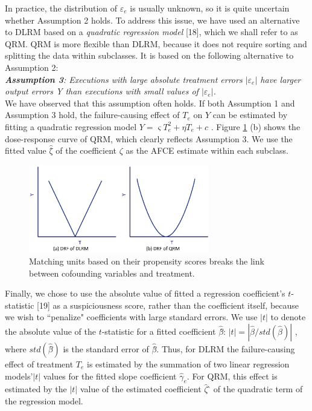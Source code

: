 \documentclass[times]{stvrauth}
\begin{document}
In practice, the distribution of $\varepsilon_e$  is usually unknown, so it is quite uncertain whether Assumption 2 holds.  To address this issue, we have used an alternative to DLRM based on a {\it quadratic regression model} [18], which we shall refer to as QRM.   QRM is more flexible than DLRM, because it does not require sorting and splitting the data within subclasses.  It is based on the following alternative to Assumption 2:\\
\newline
\textit{ \textbf{ Assumption 3}: Executions with large absolute treatment errors $\left| {{\varepsilon _e}} \right|$ have larger output errors Y than executions with small values of $\left| {{\varepsilon _e}} \right|$.}\\
\newline
We have observed that this assumption often holds.  If both Assumption 1 and Assumption 3 hold, the failure-causing effect of $T_e$ on $Y$ can be estimated by fitting a quadratic regression model $Y = \varsigma T_e^2 + \eta {T_e} + c$  . Figure \ref{DRF_curves} (b) shows the dose-response curve of QRM, which clearly reflects Assumption 3.  We use the fitted value $\hat \zeta $̂ of the coefficient $ \zeta $ as the AFCE estimate within each subclass.
\vspace{-0.1cm}

\begin{figure}[!thpb]
\centering
\includegraphics[width=0.7\textwidth]{DRF_curves.eps}
\caption{Matching units based on their propensity scores breaks the link between cofounding variables and treatment.}
\label{DRF_curves}
\end{figure}
\vspace{-0.1cm}

Finally, we chose to use the absolute value of fitted a regression coefficient's $t$-statistic [19] as a suspiciousness score, rather than the coefficient itself, because we wish to ``penalize" coefficients with large standard errors.  We use $\left| t \right|$ to denote the absolute value of the $t$-statistic for a fitted coefficient $\hat \beta $̂: $\left| t \right| = |\hat \beta /std ( {\hat \beta })|$ , where $std(\hat \beta ̂)$ is the standard error of $\hat \beta$̂.  Thus, for DLRM the failure-causing effect of treatment $T_e$ is estimated by the summation of two linear regression models'$\left| t \right|$ values for the fitted slope coefficient ${{\hat \gamma }_e}$.  For QRM, this effect is estimated by the $\left| t \right|$ value of the estimated coefficient ${\hat \zeta }$ ̂ of the quadratic term of the regression model.
\end{document}
